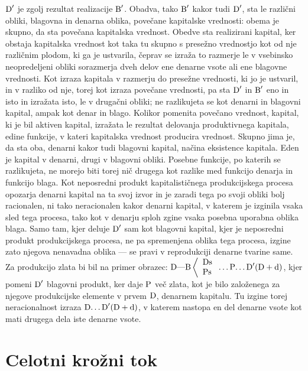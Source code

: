 \documentclass[kapital_02.tex]{subfiles}
\begin{document}
\( \textrm{D}' \) je zgolj rezultat realizacije \( \textrm{B}' \). Obadva, tako \( \textrm{B}' \) kakor tudi \( \textrm{D}' \), sta le različni obliki, blagovna in denarna oblika, povečane kapitalske vrednosti: obema je skupno, da sta povečana kapitalska vrednost. Obedve sta realizirani kapital, ker obstaja kapitalska vrednost kot taka tu skupno s presežno vrednostjo kot od nje različnim plodom, ki ga je ustvarila, čeprav se izraža to razmerje le v vsebinsko neopredeljeni obliki sorazmerja dveh delov ene denarne vsote ali ene blagovne vrednosti. Kot izraza kapitala v razmerju do presežne vrednosti, ki jo je ustvaril, in v razliko od nje, torej kot izraza povečane vrednosti, pa sta \( \textrm{D}' \) in \( \textrm{B}' \) eno in isto in izražata isto, le v drugačni obliki; ne razlikujeta se kot denarni in blagovni kapital, ampak kot denar in blago. Kolikor pomenita povečano vrednost, kapital, ki je bil aktiven kapital, izražata le rezultat delovanja produktivnega kapitala, edine funkcije, v kateri kapitalska vrednost producira vrednost. Skupno jima je, da sta oba, denarni kakor tudi blagovni kapital, načina eksistence kapitala. Eden je kapital v denarni, drugi v blagovni obliki. Posebne funkcije, po katerih se razlikujeta, ne morejo biti torej nič drugega kot razlike med funkcijo denarja in funkcijo blaga. Kot neposredni produkt kapitalističnega produkcijskega procesa opozarja denarni kapital na ta svoj izvor in je zaradi tega po svoji obliki bolj racionalen, ni tako neracionalen kakor denarni kapital, v katerem je izginila vsaka sled tega procesa, tako kot v denarju sploh zgine vsaka posebna uporabna oblika blaga. Samo tam, kjer deluje \( \textrm{D}' \) sam kot blagovni kapital, kjer je neposredni produkt produkcijskega procesa, ne pa spremenjena oblika tega procesa, izgine zato njegova nenavadna oblika --- se pravi v reprodukciji denarne tvarine same. Za produkcijo zlata bi bil na primer obrazec: \( 
    \textrm{D}\textrm{---}\textrm{B}\left< 
    \begin{array}{l}
        \textrm{Ds}\\
        \textrm{Ps}\\
    \end{array}
    \right.\textrm{\dots}\textrm{P}\textrm{\dots}\textrm{D}' (\textrm{D} + \textrm{d})
\), kjer pomeni \( \textrm{D}' \) blagovni produkt, ker daje \( \textrm{P} \) več zlata, kot je bilo založenega za njegove produkcijske elemente v prvem \( \textrm{D} \), denarnem kapitalu. Tu izgine torej neracionalnost izraza \( \textrm{D}\textrm{\dots}\textrm{D}' (\textrm{D} + \textrm{d}) \), v katerem nastopa en del denarne vsote kot mati drugega dela iste denarne vsote.

\section{Celotni krožni tok}
\end{document}
